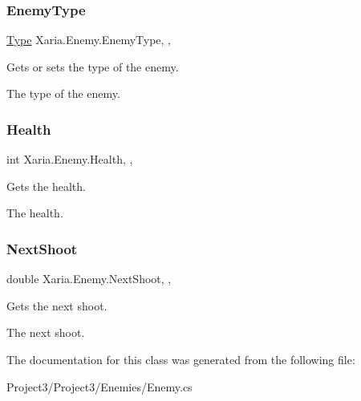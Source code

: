 \subsubsection{\texorpdfstring{Enemy\+Type}{EnemyType}}
{\footnotesize\ttfamily \hyperlink{classXaria_1_1Enemy_af736652ccf0a3aabacb41bd1afd41234}{Type} Xaria.\+Enemy.\+Enemy\+Type\hspace{0.3cm}{\ttfamily [get]}, {\ttfamily [set]}, {\ttfamily [protected]}}



Gets or sets the type of the enemy. 

The type of the enemy. \mbox{\label{classXaria_1_1Enemy_a074d424a513ab8a574e903f3eda7b9a1}} 
\subsubsection{\texorpdfstring{Health}{Health}}
{\footnotesize\ttfamily int Xaria.\+Enemy.\+Health\hspace{0.3cm}{\ttfamily [get]}, {\ttfamily [set]}, {\ttfamily [protected]}}



Gets the health. 

The health. \mbox{\label{classXaria_1_1Enemy_a29bbc071a0375540281b0f6c2bb36dea}} 
\subsubsection{\texorpdfstring{Next\+Shoot}{NextShoot}}
{\footnotesize\ttfamily double Xaria.\+Enemy.\+Next\+Shoot\hspace{0.3cm}{\ttfamily [get]}, {\ttfamily [set]}, {\ttfamily [protected]}}



Gets the next shoot. 

The next shoot. 

The documentation for this class was generated from the following file\+:\begin{DoxyCompactItemize}
\item 
Project3/\+Project3/\+Enemies/Enemy.\+cs\end{DoxyCompactItemize}
